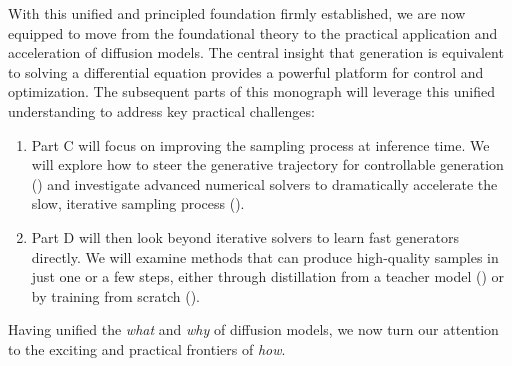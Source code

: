 With this unified and principled foundation firmly established, we are now equipped to move from the foundational theory to the practical application and acceleration of diffusion models. The central insight that generation is equivalent to solving a differential equation provides a powerful platform for control and optimization. The subsequent parts of this monograph will leverage this unified understanding to address key practical challenges:
\begin{enumerate}
    \item Part C will focus on improving the sampling process at inference time. We will explore how to steer the generative trajectory for controllable generation () and investigate advanced numerical solvers to dramatically accelerate the slow, iterative sampling process ().
    \item Part D will then look beyond iterative solvers to learn fast generators directly. We will examine methods that can produce high-quality samples in just one or a few steps, either through distillation from a teacher model () or by training from scratch ().
\end{enumerate}

Having unified the \textit{what} and \textit{why} of diffusion models, we now turn our attention to the exciting and practical frontiers of \textit{how}.









